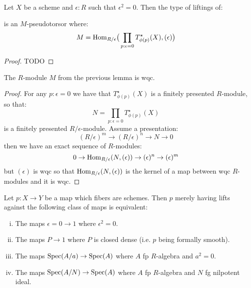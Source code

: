 \begin{lemma}\label{lifting-is-torsor}
Let $X$ be a scheme and $\epsilon:R$ such that $\epsilon^2=0$. Then the type of liftings of:
 \begin{center}
    \end{center} 
is an $M$-pseudotorsor where:
\[M = \mathrm{Hom}_{R/\epsilon}\big(\prod_{p:\epsilon=0}T^\star_{\phi(p)}(X),(\epsilon)\big)\]
\end{lemma}
\begin{proof}
TODO
\end{proof}

\begin{lemma}\label{M-is-wqc}
The $R$-module $M$ from the previous lemma is wqc.
\end{lemma}

\begin{proof}
For any $p:\epsilon=0$ we have that $T^\star_{\phi(p)}(X)$ is a finitely presented $R$-module, so that:
\[N = \prod_{p:\epsilon=0}T^\star_{\phi(p)}(X)\]
is a finitely presented $R/\epsilon$-module. Assume a presentation:
\[
(R/\epsilon)^m \to (R/\epsilon)^n\to N\to 0
\]
then we have an exact sequence of $R$-modules:
\[
0\to \mathrm{Hom}_{R/\epsilon}(N,(\epsilon)) \to (\epsilon)^n\to (\epsilon)^m
\]
but $(\epsilon)$ is wqc so that $\mathrm{Hom}_{R/\epsilon}(N,(\epsilon))$ is the kernel of a map between wqc $R$-modules and it is wqc.
\end{proof}

\begin{proposition}
Let $p:X\to Y$ be a map which fibers are schemes. Then $p$ merely having lifts against the following class of maps is equivalent:
\begin{enumerate}[(i)]
\item The maps $\epsilon=0\to 1$ where $\epsilon^2=0$.
\item The maps $P\to 1$ where $P$ is closed dense (i.e. $p$ being formally smooth).
\item The maps $\operatorname{Spec}(A/a)\to \operatorname{Spec}(A)$ where $A$ fp $R$-algebra and $a^2=0$.
\item The maps $\operatorname{Spec}(A/N)\to \operatorname{Spec}(A)$ where $A$ fp $R$-algebra and $N$ fg nilpotent ideal.
\end{enumerate}
\end{proposition}

